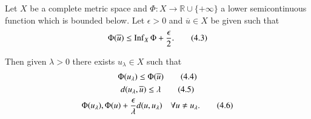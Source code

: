 \begin{theorem}\label{chap4-thm4.2}
Let $X$ be a complete metric space and $\Phi:X\to \mathbb{R}\cup
\{+\infty\}$ a lower semicontinuous function which is bounded
below. Let $\epsilon>0$ and $\overline{u}\in X$ be given such that
\begin{equation*}
\Phi(\overline{u})\leq
\operatorname{Inf}_{X}\Phi+\frac{\epsilon}{2}.\tag{4.3}\label{chap4-eq4.3} 
\end{equation*}

Then given $\lambda>0$ there exists $u_{\lambda}\in X$ such that
\begin{gather*}
\Phi(u_{\lambda})\leq \Phi(\overline{u})\tag{4.4}\label{chap4-eq4.4}\\
d(u_{\lambda},\overline{u})\leq \lambda\tag{4.5}\label{chap4-eq4.5}\\
\Phi(u_{\lambda}),\Phi(u)+\frac{\epsilon}{\lambda}d(u,u_{\lambda})\quad
\forall u\neq u_{\lambda}.\tag{4.6}\label{chap4-eq4.6} 
\end{gather*}
\end{theorem}

